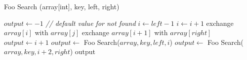 \documentclass[a4paper]{article}
\theoremstyle{remarksStyle}
\theoremstyle{questionStyle}
\theoremstyle{answerStyle}
\begin{document}
\begin{algorithm}[H]
  \caption{Foo Search (array[int], key, left, right)}
  \begin{algorithmic}[1]
    \STATE $output \gets -1$ \quad \textit{// default value for not found}
    \STATE  $i \gets left - 1$
              \STATE $i \gets i+1$
              \STATE exchange $array[i]$ with $array[j]$
          \ENDIF
      \ENDFOR  
      \STATE exchange $array[i+1]$ with $array[right]$
          \STATE  $output \gets i+1$
         \STATE  $output \gets$  Foo Search($array, key, left, i$)
      \ELSE
          \STATE $output \gets$    Foo Search($array, key, i+2, right$)
      \ENDIF
    \ENDIF
    \RETURN output
  \end{algorithmic} 
\end{algorithm} 



\newpage
\end{document}
